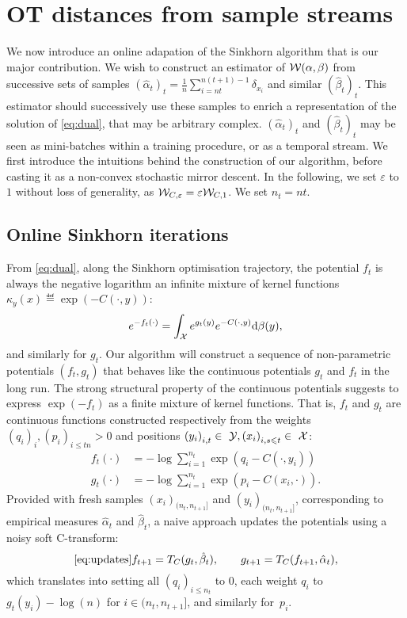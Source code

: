 
\section{OT distances from sample streams}

We now introduce an online adapation of the Sinkhorn algorithm that is our major contribution. We
wish to construct an estimator of $\mathcal{W}(\alpha,\beta)$ from successive sets of
samples $(\hat \alpha_t)_t = \frac{1}{n} \sum_{i=nt}^{n(t+1) - 1} \delta_{x_i}$
 and similar ${(\hat \beta_t)}_t$. This estimator should
successively use these samples to enrich a representation of the solution of
\eqref{eq:dual}, that may be arbitrary complex. $(\hat \alpha_t)_t$ and $(\hat
\beta_t)_t$ may be seen as mini-batches within a training procedure, or as a
temporal stream. We first introduce the intuitions behind the construction of
our algorithm, before casting it as a non-convex stochastic mirror descent. In the following, we 
set $\varepsilon$ to $1$ without loss of generality, as $\mathcal{W}_{C, \varepsilon} = \varepsilon \mathcal{W}_{C, 1}$. 
We set $n_t = nt$.

\subsection{Online Sinkhorn iterations}

From \eqref{eq:dual}, along the Sinkhorn optimisation trajectory, the potential $f_t$ is always the negative logarithm an
infinite mixture of kernel functions $\kappa_y(x) \eqdef \exp(-C(\cdot, y))$:
\begin{equation*}
    e^{-f_t(\cdot)} = 
    \int_{\mathcal{X}} e^{g_t(y)}  e^{-C(\cdot, y)} \textrm{d} \beta(y),
\end{equation*}
and similarly for $g_t$. Our algorithm will construct a sequence of
non-parametric potentials $(f_t, g_t)$ that behaves like the continuous
potentials $g_t$ and $f_t$ in the long run. The strong structural property of
the continuous potentials suggests to express
$\exp(-f_t)$ as a finite mixture of kernel functions.
That is, $f_t$ and $g_t$ are continuous functions constructed
respectively from the weights ${(q_i)}_{i}, {(p_i)}_{i \leq tn} > 0$ and
positions ${(y_i)}_{i,t} \in~\mathcal{Y}, {(x_i)}_{i,s\leqslant t} \in~\mathcal{X}$:
\begin{align}\label{eq:param}
    f_t(\cdot) &= - \log \sum_{i=1}^{n_t} 
    \exp(q_i - C(\cdot, y_i)) \\
    g_t(\cdot) &= - \log \sum_{i=1}^{n_t}
    \exp(p_i - C(x_i, \cdot)).
\end{align}
Provided with fresh samples $(x_i)_{(n_t, n_{t+1}]}$ and $(y_i)_{(n_t, n_{t+1}]}$, 
corresponding to empirical measures $\hat \alpha_t$ and $\hat \beta_t$, a naive approach
 updates the potentials using a noisy soft C-transform:
\begin{equation}\eqref{eq:updates}
     f_{t+1} = T_{C}(g_t, \hat \beta_t),
    \qquad g_{t+1} = T_{C}(f_{t+1}, \hat \alpha_t),
\end{equation}
which translates into setting all $(q_i)_{i \leq n_t}$ to $0$, each weight
 $q_i$ to $g_t(y_i) - \log(n)$ for $i \in (n_t, n_{t+1}]$, and similarly for~$p_i$.

